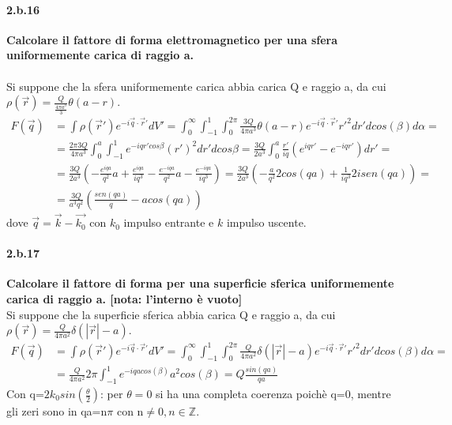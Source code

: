 \documentclass[twoside]{article}
\begin{document}
\paragraph{2.b.16}\textbf{Calcolare il fattore di forma elettromagnetico per una sfera uniformemente carica di raggio a.}\\ \\
Si suppone che la sfera uniformemente carica abbia carica Q e raggio a, da cui  $\rho(\vec{r})=\frac{Q}{\frac{4 \pi a^3}{3}} \theta(a-r)$.
\begin{align}
     F(\vec{q})&=\int \rho(\vec{r}')e^{-i\vec{q}\cdot\vec{r}'}dV'=\int_0^\infty\int_{-1}^1\int_0^{2\pi}\frac{3Q}{4 \pi a^3} \theta(a-r) e^{-i\vec{q}\cdot\vec{r}'}r'^2dr'dcos(\beta)d\alpha=\\
     &= \frac{2 \pi 3Q}{4 \pi a^3}\int_0^a\int_{-1}^1 e^{-iqr'cos\beta}(r')^2 dr' dcos\beta=\frac{3 Q}{2 a^3}\int_0^{a} \frac{r'}{i q} (e^{iqr'}-e^{-iqr'}) dr' =\\&=\frac{3 Q}{2 a^3} \left( -\frac{e^{iqa}}{q^2}a +\frac{e^{iqa}}{iq^3} -\frac{e^{-iqa}}{q^2}a -\frac{e^{-iqa}}{iq^3} \right)=\frac{3 Q}{2 a^3} \left( -\frac{a}{q^2}2cos(qa)+\frac{1}{iq^3} 2i sen(qa) \right)=\\
     &=\frac{3Q}{a^3 q^2}\left( \frac{sen(qa)}{q} - a cos(qa)\right)
\end{align}
dove $\vec{q}=\vec{k}-\vec{k_0}$ con $k_0$ impulso entrante e $k$ impulso uscente.

\paragraph{2.b.17}\textbf{Calcolare il fattore di forma per una superficie sferica uniformemente carica di raggio a. [nota: l'interno è vuoto]}\\
Si suppone che la superficie sferica abbia carica Q e raggio a, da cui $\rho(\vec{r})=\frac{Q}{4\pi a^2}\delta(|\vec{r}|-a)$.
\begin{align}
     F(\vec{q})&=\int \rho(\vec{r}')e^{-i\vec{q}\cdot\vec{r}'}dV'=\int_0^\infty\int_{-1}^1\int_0^{2\pi}\frac{Q}{4\pi a^2}\delta(|\vec{r}|-a)e^{-i\vec{q}\cdot\vec{r}'}r'^2dr'dcos(\beta)d\alpha=\\
     &=\frac{Q}{4\pi a^2}2\pi\int_{-1}^1e^{-iqacos(\beta)}a^2cos(\beta)=Q\frac{sin(qa)}{qa}  
\end{align}
Con q=$2k_0sin(\frac{\theta}{2})$: per $\theta=0$ si ha una completa coerenza poichè q=0, mentre gli zeri sono in qa=n$\pi$ con n$\ne 0, n\in \mathds{Z}$.
\end{document}
